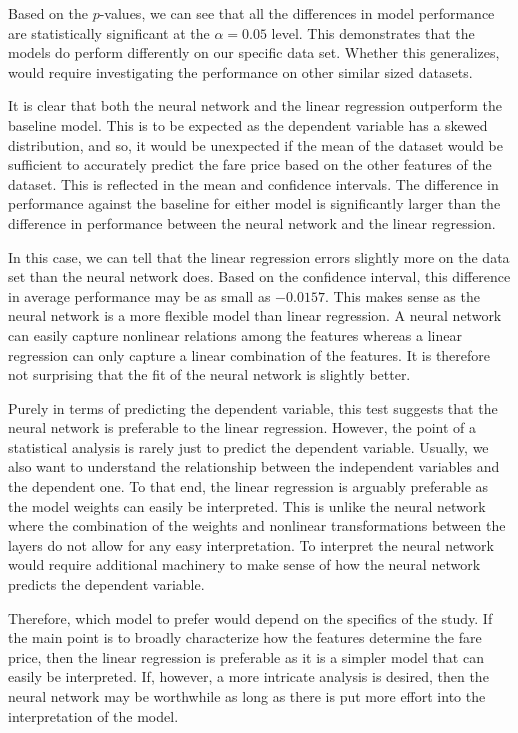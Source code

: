 Based on the \(p\)-values, we can see that all the differences in model
performance are statistically significant at the \(\alpha = 0.05\) level.
This demonstrates that the models do perform differently on our
specific data set. Whether this generalizes, would require investigating the
performance on other similar sized datasets.

It is clear that both the neural network and the linear regression
outperform the baseline model. This is to be expected as the dependent variable
has a skewed distribution, and so, it would be unexpected if the mean of the
dataset would be sufficient to accurately predict the fare price based on the
other features of the dataset. This is reflected in the mean and confidence intervals.
The difference in performance against the baseline for either model
is significantly larger than the difference in performance between
the neural network and the linear regression.

In this case, we can tell that the linear regression errors slightly more
on the data set than the neural network does. Based on the confidence interval,
this difference in average performance may be as small as \(-0.0157\).
This makes sense as the neural network is a more flexible model than linear
regression. A neural network can easily capture nonlinear relations
among the features whereas a linear regression can only capture a linear
combination of the features. It is therefore not surprising that the fit
of the neural network is slightly better.

Purely in terms of predicting the dependent variable, this test suggests
that the neural network is preferable to the linear regression. However,
the point of a statistical analysis is rarely just to predict the dependent
variable. Usually, we also want to understand the relationship between
the independent variables and the dependent one. To that end, the linear
regression is arguably preferable as the model weights can easily be
interpreted. This is unlike the neural network where the combination of the
weights and nonlinear transformations between the layers do not allow for
any easy interpretation. To interpret the neural network would require
additional machinery to make sense of how the neural network predicts
the dependent variable.

Therefore, which model to prefer would depend on the specifics of the study.
If the main point is to broadly characterize how the features determine the
fare price, then the linear regression is preferable as it is a simpler model
that can easily be interpreted. If, however, a more intricate analysis is desired,
then the neural network may be worthwhile as long as there is put more effort
into the interpretation of the model.
